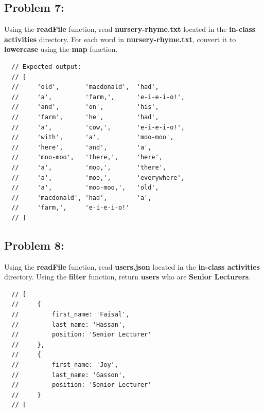 \documentclass{article}
\begin{document}
\subsection*{Problem 7:}
Using the \textbf{readFile} function, read \textbf{nursery-rhyme.txt} located in the \textbf{in-class activities} directory. For each word in \textbf{nursery-rhyme.txt}, convert it to \textbf{lowercase} using the \textbf{map} function.

\begin{verbatim}
  // Expected output:
  // [
  //     'old',       'macdonald',  'had',
  //     'a',         'farm,',      'e-i-e-i-o!',
  //     'and',       'on',         'his',
  //     'farm',      'he',         'had',
  //     'a',         'cow,',       'e-i-e-i-o!',
  //     'with',      'a',          'moo-moo',
  //     'here',      'and',        'a',
  //     'moo-moo',   'there,',     'here',
  //     'a',         'moo,',       'there',
  //     'a',         'moo,',       'everywhere',
  //     'a',         'moo-moo,',   'old',
  //     'macdonald', 'had',        'a',
  //     'farm,',     'e-i-e-i-o!'
  // ]
\end{verbatim}

\subsection*{Problem 8:}
Using the \textbf{readFile} function, read \textbf{users.json} located in the \textbf{in-class activities} directory. Using the \textbf{filter} function, return \textbf{users} who are \textbf{Senior Lecturers}.

\begin{verbatim}
  // [
  //     {
  //         first_name: 'Faisal',
  //         last_name: 'Hassan',
  //         position: 'Senior Lecturer'
  //     },
  //     {
  //         first_name: 'Joy',
  //         last_name: 'Gasson',
  //         position: 'Senior Lecturer'
  //     }
  // [
\end{verbatim}
\end{document}
